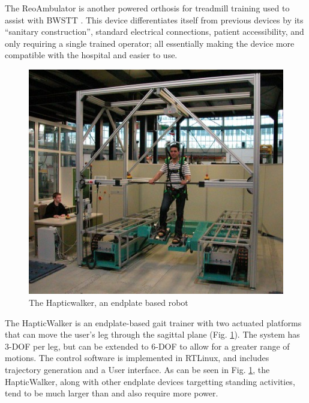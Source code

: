 \documentclass[12pt]{report}
\begin{document}
	The ReoAmbulator is another powered orthosis for treadmill training used to assist with BWSTT \cite{West2002}. This device differentiates itself from previous devices by its ``sanitary construction'', standard electrical connections, patient accessibility, and only requiring a single trained operator; all essentially making the device more compatible with the hospital and easier to use. 
	
	
	
	\begin{figure}[h] 
		\centering
		\includegraphics[width=0.7\linewidth]{Hapticwalker}
		\caption{The Hapticwalker, an endplate based robot}
		\label{fig:Hapticwalker}
	\end{figure}
	
	The HapticWalker \cite{Schmidt2005} is an endplate-based gait trainer with two actuated platforms that can move the user's leg through the sagittal plane (Fig. \ref{fig:Hapticwalker}). The system has 3-DOF per leg, but can be extended to 6-DOF to allow for a greater range of motions. The control software is implemented in RTLinux, and includes trajectory generation and a User interface. As can be seen in Fig. \ref{fig:Hapticwalker}, the HapticWalker, along with other endplate devices targetting standing activities, tend to be much larger than and also require more power.
	
\end{document}
